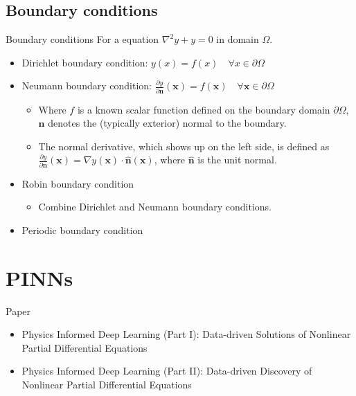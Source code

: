 \documentclass[aspectratio=1610,xcolor={dvipsnames},hyperref={colorlinks,unicode,linkcolor=violet,anchorcolor=BlueViolet,citecolor=YellowOrange,filecolor=black,urlcolor=Aquamarine}]{beamer}
\begin{document}
\subsection{Boundary conditions}
\label{sec:orge0d99c3}

\begin{frame}[label={sec:orgf5d6374}]{Boundary conditions}
For a equation \(\nabla^{2}y+y=0\) in domain \(\Omega\).

\begin{itemize}
\item Dirichlet boundary condition: \(y(x)=f(x)\quad \forall x\in \partial \Omega\)
\item Neumann boundary condition: \(\frac {\partial y}{\partial \mathbf {n} }(\mathbf {x} )=f(\mathbf {x} )\quad \forall \mathbf {x} \in \partial \Omega\)
\begin{itemize}
\item Where \(f\) is a known scalar function defined on the boundary domain \(\partial \Omega\), \(\mathbf{n}\) denotes the (typically exterior) normal to the boundary.
\item The normal derivative, which shows up on the left side, is defined as \(\frac {\partial y}{\partial \mathbf {n} }(\mathbf {x} )=\nabla y(\mathbf {x} )\cdot \mathbf {\hat {n}} (\mathbf {x} )\), where \(\mathbf {\hat {n}}\) is the unit normal.
\end{itemize}
\item Robin boundary condition
\begin{itemize}
\item Combine Dirichlet and Neumann boundary conditions.
\end{itemize}
\item Periodic boundary condition
\end{itemize}
\end{frame}

\section{PINNs}
\label{sec:org5f0dd64}

\begin{frame}[label={sec:orgc272d9c}]{Paper}
\begin{itemize}
\item Physics Informed Deep Learning (Part I): Data-driven Solutions of Nonlinear Partial Differential Equations
\item Physics Informed Deep Learning (Part II): Data-driven Discovery of Nonlinear Partial Differential Equations
\end{itemize}
\end{frame}
\end{document}
